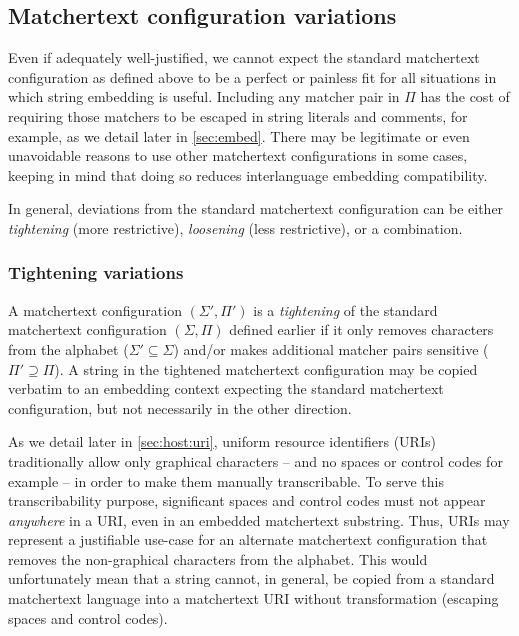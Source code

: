 \subsection{Matchertext configuration variations}
\label{sec:design:concrete:variations}

Even if adequately well-justified,
we cannot expect the standard matchertext configuration
as defined above to be a perfect or painless fit
for all situations in which string embedding is useful.
Including any matcher pair in $\Pi$ has the cost
of requiring those matchers to be escaped
in string literals and comments, for example,
as we detail later in \cref{sec:embed}.
There may be legitimate or even unavoidable reasons
to use other matchertext configurations in some cases,
keeping in mind that doing so reduces interlanguage embedding compatibility.

In general, deviations from the standard matchertext configuration
can be either \emph{tightening} (more restrictive),
\emph{loosening} (less restrictive), or a combination.

\subsubsection{Tightening variations}
\label{sec:design:concrete:variations:tight}

A matchertext configuration $(\Sigma',\Pi')$
is a \emph{tightening} of
the standard matchertext configuration $(\Sigma,\Pi)$ defined earlier
if it only removes characters from the alphabet ($\Sigma' \subseteq \Sigma$)
and/or makes additional matcher pairs sensitive ($\Pi' \supseteq \Pi$).
A string in the tightened matchertext configuration
may be copied verbatim to an embedding context
expecting the standard matchertext configuration,
but not necessarily in the other direction.

As we detail later in \cref{sec:host:uri},
uniform resource identifiers (URIs)~\cite{rfc3986} traditionally allow
only graphical characters -- and no spaces or control codes for example --
in order to make them manually transcribable.
To serve this transcribability purpose,
significant spaces and control codes must not appear \emph{anywhere} in a URI,
even in an embedded matchertext substring.
Thus, URIs may represent a justifiable use-case
for an alternate matchertext configuration that removes
the non-graphical characters from the alphabet.
This would unfortunately mean that a string cannot, in general,
be copied from a standard matchertext language into a matchertext URI
without transformation (\ie escaping spaces and control codes).

